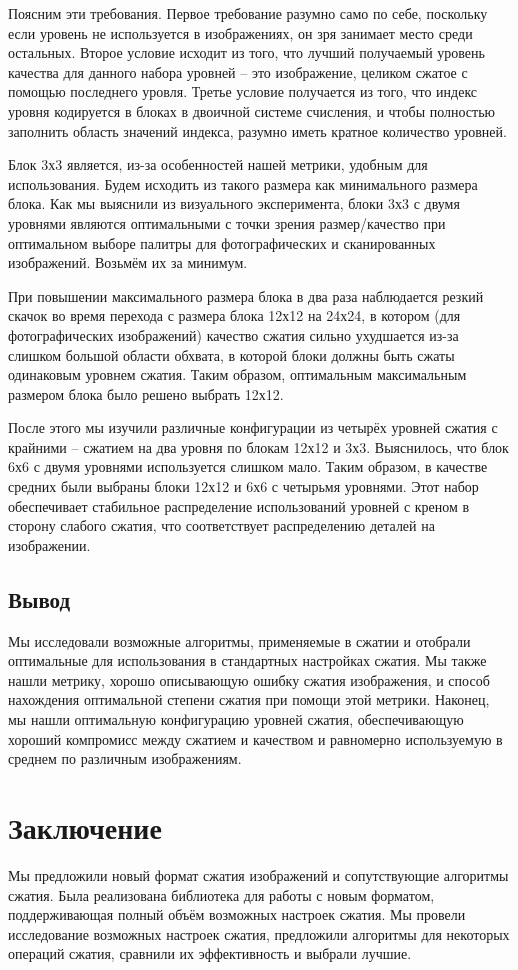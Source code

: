 \documentclass[a4paper,12pt]{article}
\numberwithin{equation}{section}
\begin{document}
Поясним эти требования. Первое требование разумно само по себе, поскольку если
уровень не используется в изображениях, он зря занимает место среди
остальных. Второе условие исходит из того, что лучший получаемый уровень
качества для данного набора уровней -- это изображение, целиком сжатое с помощью
последнего уровля. Третье условие получается из того, что индекс уровня
кодируется в блоках в двоичной системе счисления, и чтобы полностью заполнить
область значений индекса, разумно иметь кратное количество уровней.

Блок 3х3 является, из-за особенностей нашей метрики, удобным для
использования. Будем исходить из такого размера как минимального размера
блока. Как мы выяснили из визуального эксперимента, блоки 3х3 с двумя уровнями
являются оптимальными с точки зрения размер/качество при оптимальном выборе
палитры для фотографических и сканированных изображений. Возьмём их за минимум.

При повышении максимального размера блока в два раза наблюдается резкий скачок
во время перехода с размера блока 12х12 на 24х24, в котором (для фотографических
изображений) качество сжатия сильно ухудшается из-за слишком большой области
обхвата, в которой блоки должны быть сжаты одинаковым уровнем сжатия. Таким
образом, оптимальным максимальным размером блока было решено выбрать 12х12.

После этого мы изучили различные конфигурации из четырёх уровней сжатия с
крайними -- сжатием на два уровня по блокам 12х12 и 3х3. Выяснилось, что блок
6х6 с двумя уровнями используется слишком мало. Таким образом, в качестве
средних были выбраны блоки 12х12 и 6х6 с четырьмя уровнями. Этот набор
обеспечивает стабильное распределение использований уровней с креном в сторону
слабого сжатия, что соответствует распределению деталей на изображении.

\subsection{Вывод}
Мы исследовали возможные алгоритмы, применяемые в сжатии и отобрали оптимальные
для использования в стандартных настройках сжатия. Мы также нашли метрику,
хорошо описывающую ошибку сжатия изображения, и способ нахождения оптимальной
степени сжатия при помощи этой метрики. Наконец, мы нашли оптимальную
конфигурацию уровней сжатия, обеспечивающую хороший компромисс между сжатием и
качеством и равномерно используемую в среднем по различным изображениям.




\section*{Заключение}

Мы предложили новый формат сжатия изображений и сопутствующие алгоритмы
сжатия. Была реализована библиотека для работы с новым форматом, поддерживающая
полный объём возможных настроек сжатия. Мы провели исследование возможных
настроек сжатия, предложили алгоритмы для некоторых операций сжатия, сравнили их
эффективность и выбрали лучшие.

\printbibliography[heading=bibintoc]
\printbibliography[heading=counter,env=counter]
\end{document}
